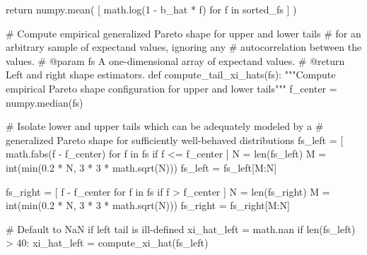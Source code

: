 \documentclass[
  letterpaper,
  DIV=11,
  numbers=noendperiod]{scrartcl}
\newenvironment{Shaded}{\begin{snugshade}}{\end{snugshade}}
\newcommand{\BuiltInTok}[1]{\textcolor[rgb]{0.00,0.23,0.31}{#1}}
\newcommand{\CommentTok}[1]{\textcolor[rgb]{0.37,0.37,0.37}{#1}}
\newcommand{\ControlFlowTok}[1]{\textcolor[rgb]{0.00,0.23,0.31}{#1}}
\newcommand{\DecValTok}[1]{\textcolor[rgb]{0.68,0.00,0.00}{#1}}
\newcommand{\FloatTok}[1]{\textcolor[rgb]{0.68,0.00,0.00}{#1}}
\newcommand{\KeywordTok}[1]{\textcolor[rgb]{0.00,0.23,0.31}{#1}}
\newcommand{\NormalTok}[1]{\textcolor[rgb]{0.00,0.23,0.31}{#1}}
\newcommand{\OperatorTok}[1]{\textcolor[rgb]{0.37,0.37,0.37}{#1}}
\begin{document}
\begin{Shaded}
\begin{Highlighting}[]
  \ControlFlowTok{return}\NormalTok{ numpy.mean( [ math.log(}\DecValTok{1} \OperatorTok{{-}}\NormalTok{ b\_hat }\OperatorTok{*}\NormalTok{ f) }\ControlFlowTok{for}\NormalTok{ f }\KeywordTok{in}\NormalTok{ sorted\_fs ] )}

\CommentTok{\# Compute empirical generalized Pareto shape for upper and lower tails}
\CommentTok{\# for an arbitrary sample of expectand values, ignoring any }
\CommentTok{\# autocorrelation between the values.}
\CommentTok{\# @param fs A one{-}dimensional array of expectand values.}
\CommentTok{\# @return Left and right shape estimators.}
\KeywordTok{def}\NormalTok{ compute\_tail\_xi\_hats(fs):}
  \CommentTok{"""Compute empirical Pareto shape configuration for upper and lower tails"""}
\NormalTok{  f\_center }\OperatorTok{=}\NormalTok{ numpy.median(fs)}
  
  \CommentTok{\# Isolate lower and upper tails which can be adequately modeled by a }
  \CommentTok{\# generalized Pareto shape for sufficiently well{-}behaved distributions}
\NormalTok{  fs\_left }\OperatorTok{=}\NormalTok{ [ math.fabs(f }\OperatorTok{{-}}\NormalTok{ f\_center) }\ControlFlowTok{for}\NormalTok{ f }\KeywordTok{in}\NormalTok{ fs }\ControlFlowTok{if}\NormalTok{ f }\OperatorTok{\textless{}=}\NormalTok{ f\_center ]}
\NormalTok{  N }\OperatorTok{=} \BuiltInTok{len}\NormalTok{(fs\_left)}
\NormalTok{  M }\OperatorTok{=} \BuiltInTok{int}\NormalTok{(}\BuiltInTok{min}\NormalTok{(}\FloatTok{0.2} \OperatorTok{*}\NormalTok{ N, }\DecValTok{3} \OperatorTok{*} \DecValTok{3} \OperatorTok{*}\NormalTok{ math.sqrt(N)))}
\NormalTok{  fs\_left }\OperatorTok{=}\NormalTok{ fs\_left[M:N]}
  
\NormalTok{  fs\_right }\OperatorTok{=}\NormalTok{ [ f }\OperatorTok{{-}}\NormalTok{ f\_center }\ControlFlowTok{for}\NormalTok{ f }\KeywordTok{in}\NormalTok{ fs }\ControlFlowTok{if}\NormalTok{ f }\OperatorTok{\textgreater{}}\NormalTok{ f\_center ]}
\NormalTok{  N }\OperatorTok{=} \BuiltInTok{len}\NormalTok{(fs\_right)}
\NormalTok{  M }\OperatorTok{=} \BuiltInTok{int}\NormalTok{(}\BuiltInTok{min}\NormalTok{(}\FloatTok{0.2} \OperatorTok{*}\NormalTok{ N, }\DecValTok{3} \OperatorTok{*} \DecValTok{3} \OperatorTok{*}\NormalTok{ math.sqrt(N)))}
\NormalTok{  fs\_right }\OperatorTok{=}\NormalTok{ fs\_right[M:N] }
  
  \CommentTok{\# Default to NaN if left tail is ill{-}defined}
\NormalTok{  xi\_hat\_left }\OperatorTok{=}\NormalTok{ math.nan}
  \ControlFlowTok{if} \BuiltInTok{len}\NormalTok{(fs\_left) }\OperatorTok{\textgreater{}} \DecValTok{40}\NormalTok{:}
\NormalTok{    xi\_hat\_left }\OperatorTok{=}\NormalTok{ compute\_xi\_hat(fs\_left)}
  

\end{Highlighting}
\end{Shaded}
\end{document}
